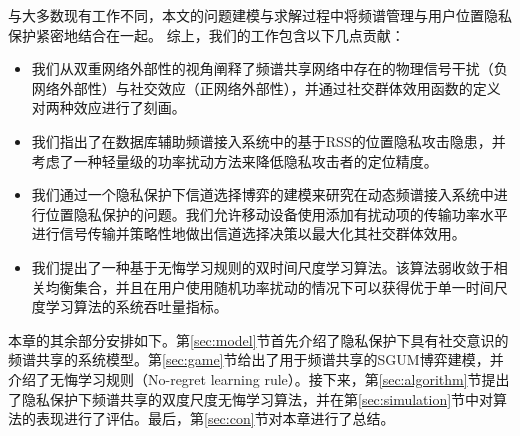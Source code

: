 与大多数现有工作不同，本文的问题建模与求解过程中将频谱管理与用户位置隐私保护紧密地结合在一起。
综上，我们的工作包含以下几点贡献：
\begin{itemize}
\item 我们从双重网络外部性的视角阐释了频谱共享网络中存在的物理信号干扰（负网络外部性）与社交效应（正网络外部性），并通过社交群体效用函数的定义对两种效应进行了刻画。
\item 我们指出了在数据库辅助频谱接入系统中的基于RSS的位置隐私攻击隐患，并考虑了一种轻量级的功率扰动方法来降低隐私攻击者的定位精度。
\item 我们通过一个隐私保护下信道选择博弈的建模来研究在动态频谱接入系统中进行位置隐私保护的问题。我们允许移动设备使用添加有扰动项的传输功率水平进行信号传输并策略性地做出信道选择决策以最大化其社交群体效用。
\item 我们提出了一种基于无悔学习规则的双时间尺度学习算法。该算法弱收敛于相关均衡集合，并且在用户使用随机功率扰动的情况下可以获得优于单一时间尺度学习算法的系统吞吐量指标。
\end{itemize}
本章的其余部分安排如下。第\ref{sec:model}节首先介绍了隐私保护下具有社交意识的频谱共享的系统模型。第\ref{sec:game}节给出了用于频谱共享的SGUM博弈建模，并介绍了{\kaishu 无悔学习规则}（No-regret learning rule）。接下来，第\ref{sec:algorithm}节提出了隐私保护下频谱共享的双度尺度无悔学习算法，并在第\ref{sec:simulation}节中对算法的表现进行了评估。最后，第\ref{sec:con}节对本章进行了总结。
